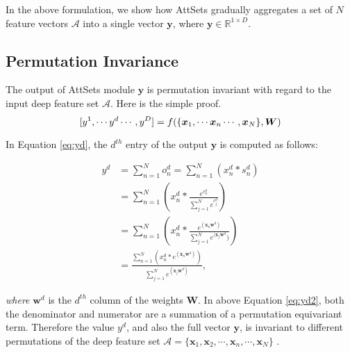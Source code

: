 \documentclass[twocolumn]{svjour3}    \pdfoutput=1
\newcommand{\nickname}{AttSets}
\begin{document}
In the above formulation, we show how \nickname{} gradually aggregates a set of $N$ feature vectors $\mathcal{A}$ into a single vector $\boldsymbol{y}$, where $\boldsymbol{y} \in \mathbb{R}^{1\times D}$. 

\subsection{Permutation Invariance}
The output of \nickname{} module $\boldsymbol{y}$ is permutation invariant with regard to the input deep feature set $\mathcal{A}$. Here is the simple proof. 
\begin{equation}
\setlength{\abovedisplayskip}{3pt}
\setlength{\belowdisplayskip}{0pt}
\label{eq:yd}
[y^1, \cdots y^d \cdots, y^D] = f(\{\boldsymbol{x}_1, \cdots \boldsymbol{x}_n \cdots, \boldsymbol{x}_N\}, \boldsymbol{W})
\end{equation}

In Equation \ref{eq:yd}, the $d^{th}$ entry of the output $\boldsymbol{y}$ is computed as follows:
\begin{ceqn}
\begin{align}
\label{eq:yd2}
y^d &= \sum^N_{n=1}o^d_n  = \sum^N_{n=1}(x^d_n*s^d_n) \nonumber \\
&= \sum^N_{n=1}\left( x^d_n * \frac{e^{c^d_n}}{\sum^N_{j=1} e^{c^d_j}  }  \right) \nonumber \\
&= \sum^N_{n=1}\left( x^d_n * \frac{e^{(\boldsymbol{x}_n\boldsymbol{w}^d)} } 
{ \sum^N_{j=1}e^{(\boldsymbol{x}_j\boldsymbol{w}^d})} \right)  \nonumber \\
&=\frac{\sum^N_{n=1} \left( x^d_n * e^ {(\boldsymbol{x}_n\boldsymbol{w}^d)} \right) }
{\sum^N_{j=1}e^{(\boldsymbol{x}_j\boldsymbol{w}^d)}}, \qquad 
\end{align}
\end{ceqn}
\textit{where} $\boldsymbol{w}^d$ is the $d^{th}$ column of the weights $\boldsymbol{W}$. In above Equation \ref{eq:yd2}, both the denominator and numerator are a summation of a permutation equivariant term. Therefore the value $y^d$, and also the full vector $\boldsymbol{y}$, is invariant to different permutations of the deep feature set $\mathcal{A}=\{\boldsymbol{x}_1, \boldsymbol{x}_2, \cdots, \boldsymbol{x}_n, \cdots, \boldsymbol{x}_N\}$ \citep{Zaheer2017}. 
\end{document}
